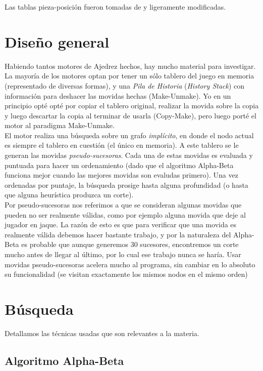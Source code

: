 \documentclass{article}
\begin{document}
Las tablas pieza-posición fueron tomadas de \cite{piece-square-table} y ligeramente modificadas.\\

\section{Diseño general}

Habiendo tantos motores de Ajedrez hechos, hay mucho material para
investigar. La mayoría de los motores optan por tener un sólo tablero
del juego en memoria (representado de diversas formas), y una \emph
{Pila de Historia} (\emph {History Stack}) con información para
deshacer las movidas hechas (Make-Unmake). Yo en un principio opté
opté por copiar el tablero original, realizar la movida sobre la copia
y luego descartar la copia al terminar de usarla (Copy-Make), pero luego
porté el motor al paradigma Make-Unmake.
\\

El motor realiza una búsqueda sobre un grafo \emph{implícito},
en donde el nodo actual es siempre el tablero en cuestión (el
único en memoria). A este tablero se le generan las movidas
\emph{pseudo-sucesoras}. Cada una de estas movidas es evaluada y
puntuada para hacer un ordenamiento (dado que el algoritmo Alpha-Beta
funciona mejor cuando las mejores movidas son evaludas primero). Una vez
ordenadas por puntaje, la búsqueda prosige hasta alguna profundidad (o
hasta que alguna heurística produzca un corte).
\\

Por pseudo-sucesoras nos referimos a que se consideran algunas movidas
que pueden no ser realmente válidas, como por ejemplo alguna movida que
deje al jugador en jaque. La razón de esto es que para verificar que
una movida es realmente válida debemos hacer bastante trabajo, y por la
naturaleza del Alpha-Beta es probable que aunque generemos 30 sucesores,
encontremos un corte mucho antes de llegar al último, por lo cual ese
trabajo nunca se haría. Usar movidas pseudo-sucesoras acelera mucho
al programa, sin cambiar en lo absoluto su funcionalidad (se visitan
exactamente los mismos nodos en el mismo orden)
\\

\section{Búsqueda}
Detallamos las técnicas usadas que son relevantes a la materia.

\subsection{Algoritmo Alpha-Beta}
\end{document}
